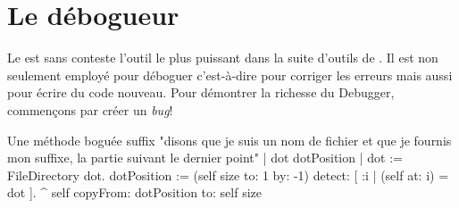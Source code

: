 \documentclass[a4paper,10pt,twoside]{book}
\begin{document}


\section{Le débogueur}

Le   est sans conteste l'outil le plus
puissant dans la suite d'outils de \pharo. 
Il est non seulement employé pour déboguer c'est-à-dire pour corriger les erreurs
mais aussi pour écrire du code nouveau.
Pour démontrer la richesse du Debugger, commençons par
créer un \emph{bug}!


\begin{method}[buggy]{Une méthode boguée}
suffix
	"disons que je suis un nom de fichier et que je fournis mon suffixe, la partie suivant le dernier point"
	| dot dotPosition |
	dot := FileDirectory dot.
	dotPosition := (self size to: 1 by: -1) detect: [ :i | (self at: i) = dot ].
	^ self copyFrom: dotPosition to: self size 
\end{method}
\end{document}
